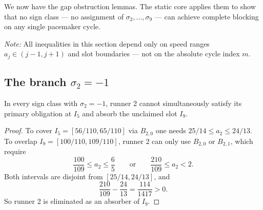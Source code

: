 \documentclass[12pt]{article}
\begin{document}
We now have the gap obstruction lemmas. The static core applies them to show that no sign
class --- no assignment of $\sigma_2,\ldots,\sigma_9$ --- can achieve complete blocking on any
single pacemaker cycle.

\noindent\emph{Note:} All inequalities in this section depend only on speed ranges $a_j\in(j-1,j+1)$ and slot boundaries --- not on the absolute cycle index $m$.

\subsection{The branch \texorpdfstring{$\sigma_2=-1$}{sigma\_2 = -1}}

\begin{lemma}\label{l:61}
In every sign class with $\sigma_2=-1$,
runner 2 cannot simultaneously satisfy its primary obligation at $I_5$ and absorb the
unclaimed slot $I_9$.

\end{lemma}
\begin{proof}
To cover $I_5=[56/110,65/110]$ via $B_{2,0}$ one needs $25/14\le a_2\le 24/13$.
To overlap $I_9=[100/110,109/110]$, runner 2 can only use $B_{2,0}$ or $B_{2,1}$,
which require
\[
\frac{100}{109}\le a_2\le \frac{6}{5}\qquad\text{or}\qquad
  \frac{210}{109}\le a_2<2.
\]
Both intervals are disjoint from $[25/14,24/13]$, and
\[
\frac{210}{109}-\frac{24}{13}=\frac{114}{1417}>0.
\]
So runner 2 is eliminated as an absorber of $I_9$.
\end{proof}
\end{document}
